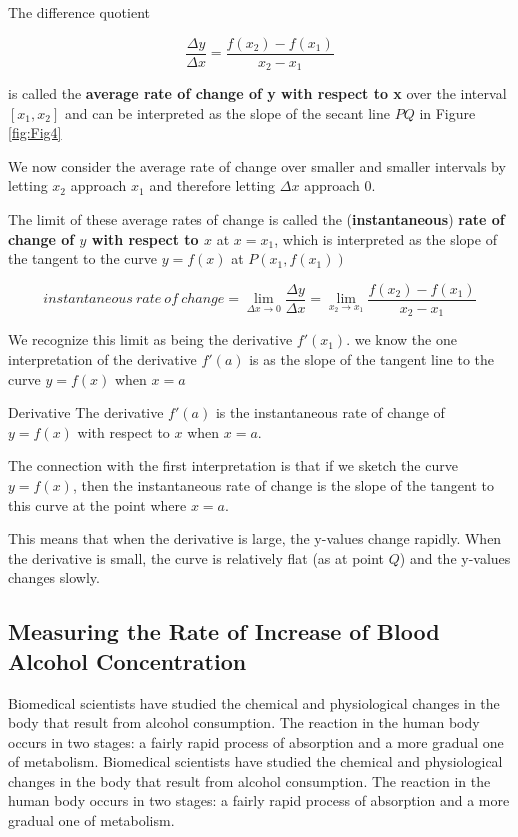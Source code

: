 \begin{flushleft}
The difference quotient

\begin{equation}
\label{eq:2}
\frac{\Delta y}{\Delta x} = \frac{f(x_2) - f(x_1)}{x_2 - x_1}
\end{equation}

is called the \textbf{average rate of change of y with respect to x} over the interval $[x_1, x_2]$ and can be interpreted as the slope of the secant line $PQ$ in Figure \ref{fig:Fig4}

We now consider the average rate of change over smaller and smaller intervals by letting $x_2$ approach $x_1$ and therefore letting $\Delta x$ approach 0.

The limit of these average rates of change is called the (\textbf{instantaneous}) \textbf{rate of change of $y$ with respect to $x$} at $x = x_1$, which is interpreted as the slope of the tangent to the curve $y = f(x)$ at $P(x_1, f(x_1))$
\end{flushleft}

\begin{equation}
\label{eq:3}
instantaneous\ rate\ of\ change = \lim_{\Delta x \to 0} \frac{\Delta y}{\Delta x} = \lim_{x_2 \to x_1} \frac{f(x_2) - f(x_1)}{x_2 - x_1}
\end{equation}

\begin{flushleft}
We recognize this limit as being the derivative $f'(x_1)$.
we know the one interpretation of the derivative $f'(a)$ is as the slope of the tangent line to the curve $y=f(x)$ when $x=a$
\end{flushleft}

\begin{mybox}{Derivative}
The derivative $f'(a)$ is the instantaneous rate of change of $y=f(x)$ with respect to $x$ when $x = a$.
\end{mybox}

\begin{flushleft}
The connection with the first interpretation is that if we sketch the curve $y = f(x)$, then the instantaneous rate of change is the slope of the tangent to this curve at the point where $x = a$.

This means that when the derivative is large, the y-values change rapidly. When the derivative is small, the curve is relatively flat (as at point $Q$) and the y-values changes slowly.
\end{flushleft}

\subsection{Measuring the Rate of Increase of Blood Alcohol Concentration}
Biomedical scientists have studied the chemical and physiological changes in the body that result from alcohol consumption. The reaction in the human body occurs in two stages: a fairly rapid process of absorption and a more gradual one of metabolism. Biomedical scientists have studied the chemical and physiological changes in the body that result from alcohol consumption. The reaction in the human body occurs in two stages: a fairly rapid process of absorption and a more gradual one of metabolism.

